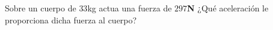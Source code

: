 
\question Sobre un cuerpo de $33$kg actua una fuerza de $297$\textbf{N}
          ¿Qué aceleración le proporciona dicha fuerza al cuerpo?

